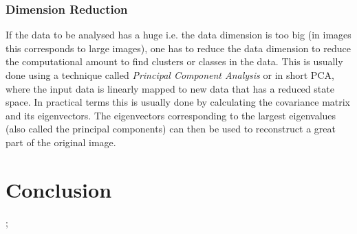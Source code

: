 \subsubsection{Dimension Reduction}
If the data to be analysed has a huge i.e. the data dimension is too big (in images this corresponds to large images), one has to reduce the data dimension to reduce the computational amount to find clusters or classes in the data. This is usually done using a technique called \textit{Principal Component Analysis} or in short PCA, where the input data is linearly mapped to new data that has a reduced state space. In practical terms this is usually done by calculating the covariance matrix and its eigenvectors. The eigenvectors corresponding to the largest eigenvalues (also called the principal components) can then be used to reconstruct a great part of the original image.

\section{Conclusion}

;